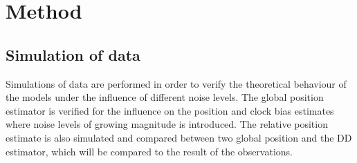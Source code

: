 

\chapter{Method}
\section{Simulation of data}\label{ch:simulationOfData}
Simulations of data are performed in order to verify the theoretical behaviour of the models under the influence of different noise levels. The global position estimator is verified for the influence on the position and clock bias estimates where noise levels of growing magnitude is introduced. The relative position estimate is also simulated and compared between two global position and the DD estimator, which will be compared to the result of the observations.

